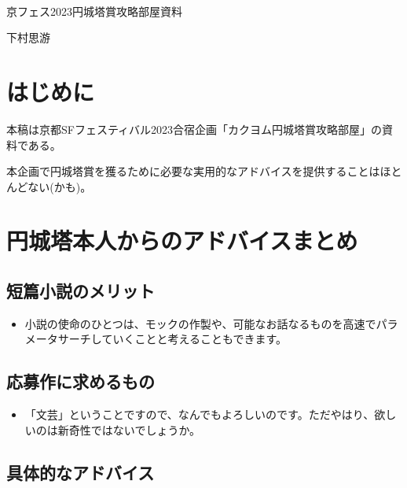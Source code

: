 \documentclass[10pt, a5paper, twoside]{jsarticle}
\theoremstyle{definition}
\begin{document}
	~ %

	\begin{center}

		\Large{京フェス2023円城塔賞攻略部屋資料}

		\vspace{3mm}
		
		\large{下村思游}

	\end{center}

	\vspace{3mm}

	\section{はじめに}

		本稿は京都SFフェスティバル2023合宿企画「カクヨム円城塔賞攻略部屋」の資料である。

		本企画で円城塔賞を獲るために必要な実用的なアドバイスを提供することはほとんどない(かも)。		

	\section{円城塔本人からのアドバイスまとめ}

		\subsection{短篇小説のメリット}

			\begin{itemize}
				\item 小説の使命のひとつは、モックの作製や、可能なお話なるものを高速でパラメータサーチしていくことと考えることもできます。\cite{int}
			\end{itemize}

		\subsection{応募作に求めるもの}

			\begin{itemize}
				\item 「文芸」ということですので、なんでもよろしいのです。ただやはり、欲しいのは新奇性ではないでしょうか。\cite{int}
			\end{itemize}

		\subsection{具体的なアドバイス}
\end{document}
